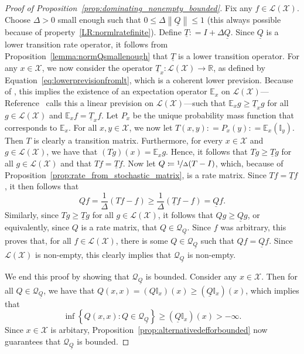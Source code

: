 \documentclass[10pt,a4paper]{paper}
\theoremstyle{definition}
\newcommand{\reals}{\mathbb{R}}
\newcommand{\states}{\mathcal{X}}
\newcommand{\lt}{\underline{T}}
\newcommand{\gambles}{\mathcal{L}}
\newcommand{\gamblesX}{\gambles(\states)}
\newcommand{\ind}[1]{\mathbb{I}_{#1}}
\newcommand{\rateset}{\mathcal{Q}}
\newcommand{\lrate}{\underline{Q}}
\newcommand{\norm}[1]{\left\lVert #1 \right\rVert}
\newcommand{\coloneqq}{:\!=}
\begin{document}
\begin{proof}[Proof of Proposition~\ref{prop:dominating_nonempty_bounded}]
Fix any $f\in\gamblesX$. Choose $\Delta>0$ small enough such that $0\leq\Delta\norm{\lrate}\leq 1$ (this always possible because of property~\ref{LR:normlratefinite}). Define $\lt\coloneqq I+\Delta\lrate$. Since $\lrate$ is a lower transition rate operator, it follows from Proposition~\ref{lemma:normQsmallenough} that $\lt$ is a lower transition operator. For any $x\in\states$, we now consider the operator $\lt_x\colon\gamblesX\to\reals$, as defined by Equation~\eqref{eq:lowerprevisionfromlt}, which is a coherent lower prevision. Because of \cite[Theorem~3.3.3(b)]{Walley:1991vk}, this implies the existence of an expectation operator $\mathbb{E}_x$ on $\gamblesX$---Reference~\cite{Walley:1991vk} calls this a linear prevision on $\gamblesX$---such that $\mathbb{E}_xg\geq\lt_xg$ for all $g\in\gamblesX$ and $\mathbb{E}_xf=\lt_xf$. Let $P_x$ be the unique probability mass function that corresponds to $\mathbb{E}_x$. For all $x,y\in\states$, we now let $T(x,y)\coloneqq P_x(y)\coloneqq \mathbb{E}_x(\ind{y})$. Then $T$ is clearly a transition matrix. Furthermore, for every $x\in\states$ and $g\in\gamblesX$, we have that $(Tg)(x)=\mathbb{E}_xg$. Hence, it follows that $Tg\geq\lt g$ for all $g\in\gamblesX$ and that $Tf=\lt f$. Now let $Q\coloneqq\nicefrac{1}{\Delta}(T-I)$, which, because of Proposition~\ref{prop:rate_from_stochastic_matrix}, is a rate matrix. Since $Tf=\lt f$, it then follows that
\begin{equation*}
Qf=\frac{1}{\Delta}(Tf-f)\geq\frac{1}{\Delta}(\lt f-f)=\lrate f.
\end{equation*}
Similarly, since $Tg\geq\lt g$ for all $g\in\gamblesX$, it follows that $Qg\geq\lrate g$, or equivalently, since $Q$ is a rate matrix, that $Q\in\rateset_{\lrate}$. Since $f$ was arbitrary, this proves that, for all $f\in\gamblesX$, there is some $Q\in\rateset_{\lrate}$ such that $Qf=\lrate f$. Since $\gamblesX$ is non-empty, this clearly implies that $\rateset_{\lrate}$ is non-empty.

We end this proof by showing that $\rateset_{\lrate}$ is bounded. Consider any $x\in\states$. Then for all $Q\in\rateset_{\lrate}$, we have that $Q(x,x)=(Q\ind{x})(x)\geq(\lrate\ind{x})(x)$, which implies that
\begin{equation*}
\inf\left\{Q(x,x)\colon Q\in\rateset_{\lrate}\right\}\geq(\lrate\ind{x})(x)>-\infty.
\end{equation*}
Since $x\in\states$ is arbitary, Proposition~\ref{prop:alternativedefforbounded} now guarantees that $\rateset_{\lrate}$ is bounded. 
\end{proof}
\end{document}
